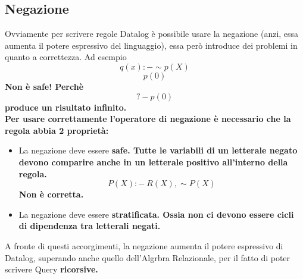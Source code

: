 \documentclass[11pt]{article} %
\begin{document}
\subsection{Negazione}
Ovviamente per scrivere regole Datalog è possibile usare la negazione (anzi, essa aumenta il potere espressivo del linguaggio), essa però introduce dei problemi in quanto a correttezza. Ad esempio $$ q(x) :- \sim p(X) $$ $$p(0) $$ \bf Non \rm è safe! Perchè $$ ?- p(0) $$ produce un risultato \bf infinito\rm. \\
Per usare correttamente l'operatore di negazione è necessario che la regola abbia 2 proprietà:
\begin{itemize}
\item La negazione deve essere \bf safe\rm. Tutte le variabili di un letterale negato devono comparire anche in un letterale positivo all'interno della regola. $$ P(X) :-\ R(X), \sim P(X)  $$ Non è corretta.
\item La negazione deve essere \bf stratificata\rm. Ossia non ci devono essere cicli di dipendenza tra letterali negati.
\end{itemize}
A fronte di questi accorgimenti, la negazione aumenta il potere espressivo di Datalog, superando anche quello dell'Algrbra Relazionale, per il fatto di poter scrivere Query \bf ricorsive\rm.
\end{document}

